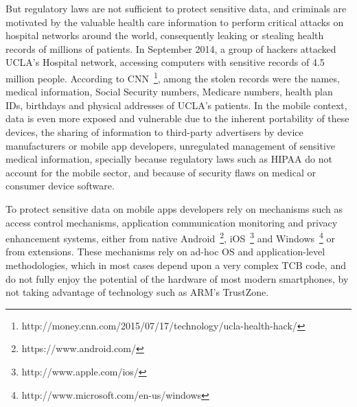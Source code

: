 But regulatory laws are not sufficient to protect sensitive data, and criminals are motivated by the valuable health care information to perform critical attacks on hospital networks around the world, consequently leaking or stealing health records of millions of patients. In September 2014, a group of hackers attacked UCLA's Hospital network, accessing computers with sensitive records of 4.5 million people. According to \ac{CNN}~\footnote{http://money.cnn.com/2015/07/17/technology/ucla-health-hack/}, among the stolen records were the names, medical information, Social Security numbers, Medicare numbers, health plan IDs, birthdays and physical addresses of UCLA's patients.
In the mobile context, data is even more exposed and vulnerable due to the inherent portability of these devices, the sharing of information to third-party advertisers by device manufacturers or mobile app developers, unregulated management of sensitive medical information, specially because regulatory laws such as \ac{HIPAA} do not account for the mobile sector, and because of security flaws on medical or consumer device software.


To protect sensitive data on mobile apps developers rely on mechanisms such as access control mechanisms, application communication monitoring and privacy enhancement systems, either from native Android~\footnote{https://www.android.com/}, iOS~\footnote{http://www.apple.com/ios/} and Windows~\footnote{http://www.microsoft.com/en-us/windows} or from extensions. These mechanisms rely on ad-hoc \ac{OS} and application-level methodologies, which in most cases depend upon a very complex \ac{TCB} code, and do not fully enjoy the potential of the hardware of most modern smartphones, by not taking advantage of technology such as ARM's TrustZone.\\


